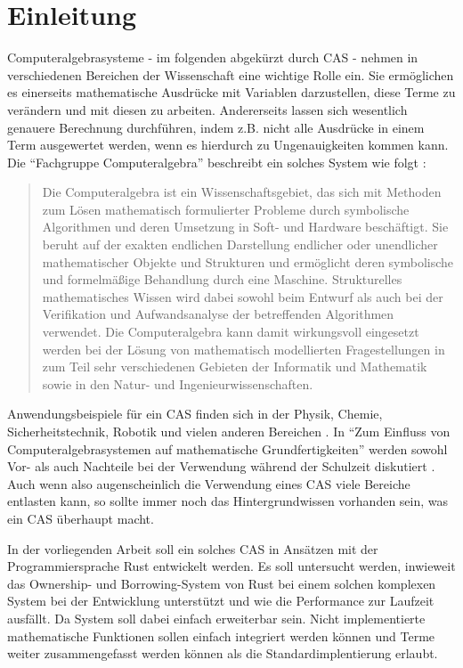 \documentclass[11pt,a4paper, ngerman]{article}
\begin{document}
\section{Einleitung}
Computeralgebrasysteme - im folgenden abgekürzt durch CAS - nehmen in verschiedenen Bereichen der Wissenschaft eine wichtige Rolle ein. Sie ermöglichen es einerseits mathematische Ausdrücke mit Variablen darzustellen, diese Terme zu verändern und mit diesen zu arbeiten. Andererseits lassen sich wesentlich genauere Berechnung durchführen, indem z.B. nicht alle Ausdrücke in einem Term ausgewertet werden, wenn es hierdurch zu Ungenauigkeiten kommen kann. Die ``Fachgruppe Computeralgebra'' beschreibt ein solches System wie folgt \cite{FachgruppeDef}:
\begin{quote}
    Die Computeralgebra ist ein Wissenschaftsgebiet, das sich mit Methoden zum Lösen mathematisch formulierter Probleme durch symbolische Algorithmen und deren Umsetzung in Soft- und Hardware beschäftigt. Sie beruht auf der exakten endlichen Darstellung endlicher oder unendlicher mathematischer Objekte und Strukturen und ermöglicht deren symbolische und formelmäßige Behandlung durch eine Maschine. Strukturelles mathematisches Wissen wird dabei sowohl beim Entwurf als auch bei der Verifikation und Aufwandsanalyse der betreffenden Algorithmen verwendet. Die Computeralgebra kann damit wirkungsvoll eingesetzt werden bei der Lösung von mathematisch modellierten Fragestellungen in zum Teil sehr verschiedenen Gebieten der Informatik und Mathematik sowie in den Natur- und Ingenieurwissenschaften.
\end{quote}

Anwendungsbeispiele für ein CAS finden sich in der Physik, Chemie, Sicherheitstechnik, Robotik und vielen anderen Bereichen \cite{FachgruppeEinsatz}. In ``Zum Einfluss von Computeralgebrasystemen auf mathematische Grundfertigkeiten'' werden sowohl Vor- als auch Nachteile bei der Verwendung während der Schulzeit diskutiert \cite[S. 17 ff.]{RN18}. Auch wenn also augenscheinlich die Verwendung eines CAS viele Bereiche entlasten kann, so sollte immer noch das Hintergrundwissen vorhanden sein, was ein CAS überhaupt macht.

In der vorliegenden Arbeit soll ein solches CAS in Ansätzen mit der Programmiersprache Rust entwickelt werden. Es soll untersucht werden, inwieweit das Ownership- und Borrowing-System von Rust bei einem solchen komplexen System bei der Entwicklung unterstützt und wie die Performance zur Laufzeit ausfällt. Da System soll dabei einfach erweiterbar sein. Nicht implementierte mathematische Funktionen sollen einfach integriert werden können und Terme weiter zusammengefasst werden können als die Standardimplentierung erlaubt.
\end{document}
